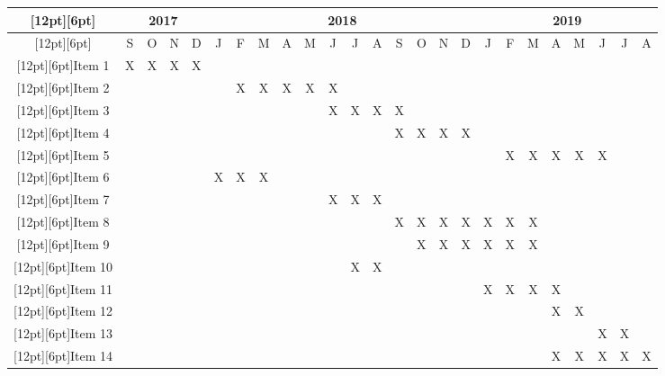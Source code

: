 \documentclass[
	12pt,				%
	oneside,			%
	a4paper,			%
	english,			%
	french,				%
	spanish,			%
	brazil,				%
	]{abntex2}
\begin{document}
\begin{landscape}
	\centering
\begin{adjustbox}{width=\textheight, totalheight=\textwidth,keepaspectratio}
\begin{tabular}{|c|c|c|c|c|c|c|c|c|c|c|c|c|c|c|c|c|c|c|c|c|c|c|c|c|}
	\hline
	\raisebox{0pt}[12pt][6pt]  & \multicolumn{4}{|c|}{2017} & \multicolumn{12}{|c|}{2018} & \multicolumn{8}{|c|}{2019} \\
	\hline
	\raisebox{0pt}[12pt][6pt]	        &S&O&N&D&J&F&M&A&M&J&J&A&S&O&N&D&J&F&M&A&M&J&J&A\\
	\hline
	\raisebox{0pt}[12pt][6pt]{Item 1}	&X&X&X&X& & & & & & & & & & & & & & & & & & & & \\
	\hline
	\raisebox{0pt}[12pt][6pt]{Item 2}       & & & & & &X&X&X&X&X& & & & & & & & & & & & & & \\
	\hline
	\raisebox{0pt}[12pt][6pt]{Item 3}	& & & & & & & & & &X&X&X&X& & & & & & & & & & & \\
	\hline
	\raisebox{0pt}[12pt][6pt]{Item 4}       & & & & & & & & & & & & &X&X&X&X& & & & & & & & \\
	\hline
	\raisebox{0pt}[12pt][6pt]{Item 5}       & & & & & & & & & & & & & & & & & &X&X&X&X&X& & \\
	\hline
	\raisebox{0pt}[12pt][6pt]{Item 6}	& & & & &X&X&X& & & & & & & & & & & & & & & & & \\
	\hline
	\raisebox{0pt}[12pt][6pt]{Item 7}	& & & & & & & & & &X&X&X& & & & & & & & & & & & \\
	\hline
	\raisebox{0pt}[12pt][6pt]{Item 8}       & & & & & & & & & & & & &X&X&X&X&X&X&X& & & & & \\
	\hline
	\raisebox{0pt}[12pt][6pt]{Item 9}       & & & & & & & & & & & & & &X&X&X&X&X&X& & & & & \\
	\hline
	\raisebox{0pt}[12pt][6pt]{Item 10}      & & & & & & & & & & &X&X& & & & & & & & & & & & \\
	\hline
	\raisebox{0pt}[12pt][6pt]{Item 11}	& & & & & & & & & & & & & & & & &X&X&X&X& & & & \\
	\hline
	\raisebox{0pt}[12pt][6pt]{Item 12}      & & & & & & & & & & & & & & & & & & & &X&X& & & \\
	\hline
	\raisebox{0pt}[12pt][6pt]{Item 13}      & & & & & & & & & & & & & & & & & & & & & &X&X& \\
	\hline
	\raisebox{0pt}[12pt][6pt]{Item 14}      & & & & & & & & & & & & & & & & & & & &X&X&X&X&X\\
	\hline
\end{tabular}
\end{adjustbox}
\end{landscape}
\end{document}
